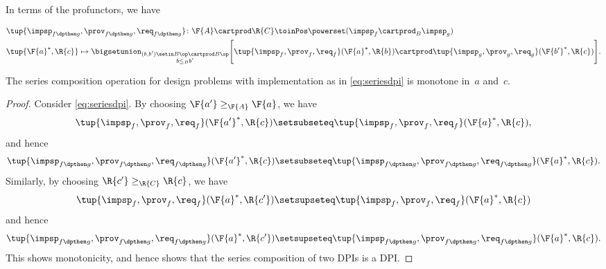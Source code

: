 {\begin{definition}
        In terms of the profunctors, we have
        \begin{widepar}
            \begin{equation}
                \label{eq:seriesdpi}
                \begin{aligned}
                     & \tup{\impsp_{f\dpthen g},\prov_{f\dpthen g},\req_{f\dpthen g}}\colon \F{A}\cartprod \R{C} \toinPos \powerset(\impsp_f \cartprod_B \impsp_g) \\
                     & \tup{\F{a}^*,\R{c}} \mapsto \bigsetunion_{\substack{(b,b') \setin B\op \cartprod B\op \\ b \leq_B b'}} \Bigg[ \tup{\impsp_f,\prov_f,\req_f}(\F{a}^*,\R{b}) \cartprod \tup{\impsp_g,\prov_g,\req_g}(\F{b'}^*,\R{c}) \Bigg].
                \end{aligned}
            \end{equation}
        \end{widepar}
    \end{definition}

    \begin{lemma}\label{lem:series-dp}
        The series composition operation for design problems with implementation as in \cref{eq:seriesdpi} is monotone in~$a$ and~$c$.
    \end{lemma}
    \begin{proof}
        Consider \cref{eq:seriesdpi}.
        By choosing $\F{a'}\geq_\F{A} \F{a}$, we have
        \begin{equation}
            \tup{\impsp_{f},\prov_{f},\req_{f}}(\F{a'}^*,\R{c})\setsubseteq \tup{\impsp_{f},\prov_{f},\req_{f}}(\F{a}^*,\R{c}),
        \end{equation}
        and hence
        \begin{equation}
            \tup{\impsp_{f\dpthen g},\prov_{f\dpthen g},\req_{f\dpthen g}}(\F{a'}^*,\R{c})\setsubseteq \tup{\impsp_{f\dpthen g},\prov_{f\dpthen g},\req_{f\dpthen g}}(\F{a}^*,\R{c}).
        \end{equation}
        Similarly, by choosing $\R{c'}\geq_{\R{C}} \R{c}$, we have
        \begin{equation}
            \tup{\impsp_{f},\prov_{f},\req_{f}}(\F{a}^*,\R{c'})\setsupseteq \tup{\impsp_{f},\prov_{f},\req_{f}}(\F{a}^*,\R{c})
        \end{equation}
        and hence
        \begin{equation}
            \tup{\impsp_{f\dpthen g},\prov_{f\dpthen g},\req_{f\dpthen g}}(\F{a}^*,\R{c'})\setsupseteq \tup{\impsp_{f\dpthen g},\prov_{f\dpthen g},\req_{f\dpthen g}}(\F{a}^*,\R{c}).
        \end{equation}
        This shows monotonicity, and hence shows that the series composition of two DPIs is a DPI.
    \end{proof}

}
